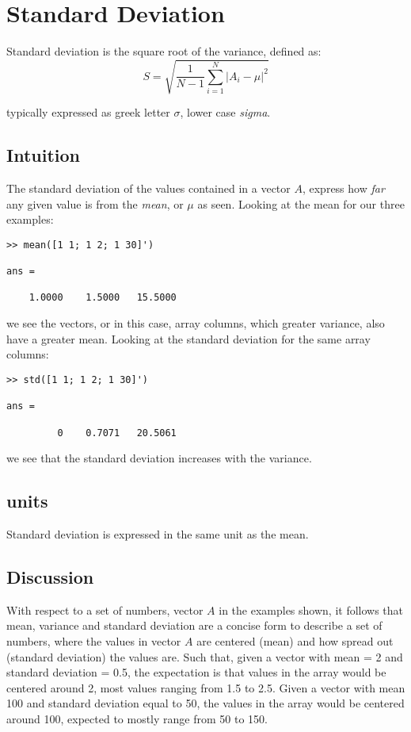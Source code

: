 \section{Standard Deviation}
Standard deviation is the square root of the variance, defined as:
\begin{equation}
S=\sqrt{\frac{1}{N-1}\sum_{i=1}^N|A_i-\mu|^2} \label{standardDeviation}    
\end{equation}


typically expressed as greek letter $\sigma$, lower case \textit{sigma}.

\subsection{Intuition}
The standard deviation of the values contained in a vector $A$, express how \textit{far} any given value is from the \textit{mean}, or $\mu$ as seen.  
Looking at the mean for our three examples:
\begin{verbatim}
>> mean([1 1; 1 2; 1 30]')

ans =

    1.0000    1.5000   15.5000
\end{verbatim}
we see the vectors, or in this case, array columns, which greater variance, also have a greater mean. Looking at the standard deviation for the same array columns:
\begin{verbatim}
>> std([1 1; 1 2; 1 30]')

ans =

         0    0.7071   20.5061
\end{verbatim}
we see that the standard deviation increases with the variance.

\subsection{units}
Standard deviation is expressed in the same unit as the mean.

\subsection{Discussion}
With respect to a set of numbers, vector $A$ in the examples shown, it follows that mean, variance and standard deviation are a concise form to describe a set of numbers, where the values in vector $A$ are centered (mean) and how spread out (standard deviation) the values are. Such that, given a vector with mean = 2 and standard deviation = 0.5, the expectation is that values in the array would be  centered around 2, most values ranging from 1.5 to 2.5. Given a vector with mean 100 and standard deviation equal to 50, the values in the array would be centered around 100, expected to mostly range from 50 to 150.